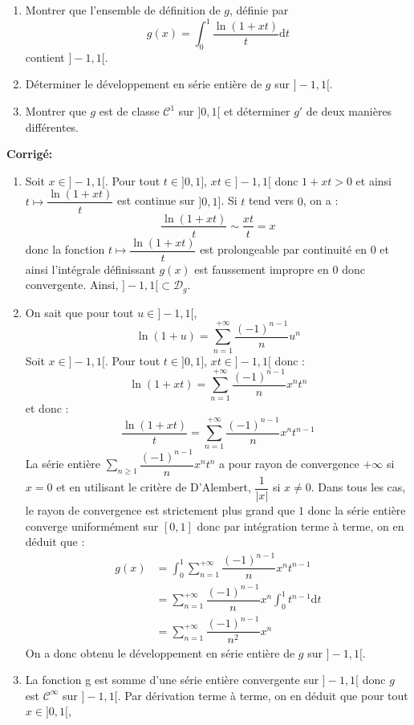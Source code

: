 \documentclass[a4paper,twoside,french,11pt]{VcCours}
\newcommand{\dt}{\text{d}t}
\newcommand{\corr}{\textbf{Corrigé:}}
\begin{document}
\begin{Exercice}{} \begin{enumerate}
\item Montrer que l'ensemble de définition de $g$, définie par 
$$ g(x) = \int_{0}^1 \dfrac{\ln(1+xt)}{t} \dt$$
contient $]-1,1[$.
\item Déterminer le développement en série entière de $g$ sur $]-1,1[$.
\item Montrer que $g$ est de classe $\mathcal{C}^1$ sur $]0,1[$ et déterminer $g'$ de deux manières différentes.
\end{enumerate}
\end{Exercice}

\corr \begin{enumerate}
\item Soit $x \in ]-1,1[$. Pour tout $t \in ]0,1]$, $xt \in ]-1,1[$ donc $1+xt >0$ et ainsi $t \mapsto \dfrac{\ln(1+xt)}{t} $ est continue sur $]0,1]$. Si $t$ tend vers $0$, on a :
$$ \dfrac{\ln(1+xt)}{t}  \sim \dfrac{xt}{t}= x$$
donc la fonction $t \mapsto \dfrac{\ln(1+xt)}{t} $ est prolongeable par continuité en $0$ et ainsi l'intégrale définissant $g(x)$ est faussement impropre en $0$ donc convergente. Ainsi, $]-1,1[ \subset \mathcal{D}_g$.
\item On sait que pour tout $u \in ]-1,1[$,
$$ \ln(1+u) = \sum_{n=1}^{+ \infty} \dfrac{(-1)^{n-1}}{n} u^n$$
Soit $x \in ]-1,1[$. Pour tout $t \in ]0,1]$, $xt \in ]-1,1[$ donc :
$$ \ln(1+xt) = \sum_{n=1}^{+ \infty} \dfrac{(-1)^{n-1}}{n} x^n t^n$$
et donc :
$$ \dfrac{\ln(1+xt)}{t} = \sum_{n=1}^{+ \infty} \dfrac{(-1)^{n-1}}{n} x^n t^{n-1}$$
La série entière $\sum_{n \geq 1} \dfrac{(-1)^{n-1}}{n} x^n t^n$ a pour rayon de convergence $+ \infty$ si $x=0$ et en utilisant le critère de D'Alembert, $\dfrac{1}{\vert x \vert}$ si $x \neq 0$. Dans tous les cas, le rayon de convergence est strictement plus grand que $1$ donc la série entière converge uniformément sur $[0,1]$ donc par intégration terme à terme, on en déduit que :
\begin{align*}
g(x) & = \int_{0}^1 \sum_{n=1}^{+ \infty} \dfrac{(-1)^{n-1}}{n} x^n t^{n-1} \\
& = \sum_{n=1}^{+ \infty} \dfrac{(-1)^{n-1}}{n} x^n \int_{0}^1 t^{n-1} \dt \\
& = \sum_{n=1}^{+ \infty} \dfrac{(-1)^{n-1}}{n^2} x^n
\end{align*} 
On a donc obtenu le développement en série entière de $g$ sur $]-1,1[$.
\item La fonction g est somme d'une série entière convergente sur $]-1,1[$ donc $g$ est $\mathcal{C}^{\infty}$ sur $]-1,1[$. Par dérivation terme à terme, on en déduit que pour tout $x \in ]0,1[$,

\end{enumerate}
\end{document}
